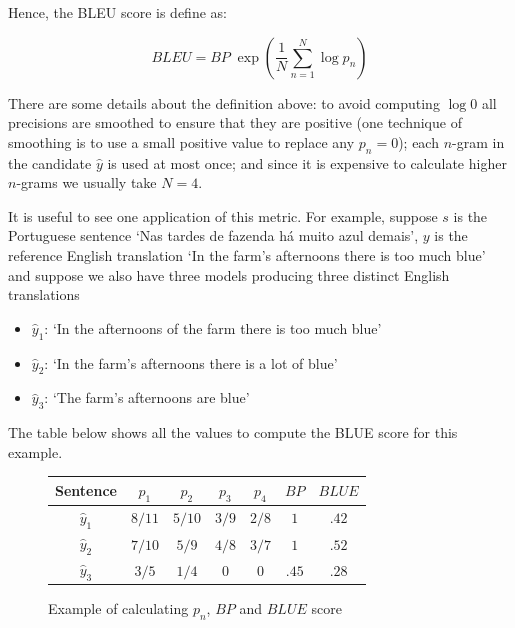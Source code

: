 Hence, the BLEU score is define as:

\begin{equation*}
BLEU = BP \; \exp \left(\frac{1}{N}  \sum_{n=1}^{N} \log p_n \right)
\end{equation*}

There are some details about the definition above: to avoid computing $\log 0$ all precisions are smoothed to ensure that they are positive (one technique of smoothing is to use a small positive value to replace any $p_n=0$); each $n$-gram in the candidate $\hat{y}$ is used at most once; and since it is expensive to calculate higher $n$-grams we usually take $N=4$.

It is useful to see one application of this metric. For example, suppose $s$ is the Portuguese sentence `Nas tardes de fazenda há muito azul demais', $y$ is the reference English translation `In the farm's afternoons there is too much blue' and suppose we also have three models producing three distinct English translations 

\begin{itemize}
\item $\hat{y}_1$: `In the afternoons of the farm there is too much blue'
\item $\hat{y}_2$: `In the farm's afternoons there is a lot of blue'
\item $\hat{y}_3$: `The farm's afternoons are blue'
\end{itemize}


The table below shows all the values to compute the BLUE score for this example.

\begin{figure}[h]
\label{bluetable}
\begin{center}
\begin{tabular}{|c|c|c|c|c|c|c|}
\hline
\cellcolor{blue!10} Sentence & \cellcolor{blue!10} $p_1$ & \cellcolor{blue!10} $p_2$ & \cellcolor{blue!10} $p_3$ & \cellcolor{blue!10} $p_4$ & \cellcolor{blue!10} $BP$ & \cellcolor{blue!10} $BLUE$ \\ \hline
\cellcolor{blue!10} $\hat{y}_1$ & $8/11$ & $5/10$ & $3/9$ & $2/8$ & $1$ & $.42$\\ \hline
\cellcolor{blue!10} $\hat{y}_2$ & $7/10$ & $5/9$ & $4/8$ & $3/7$ & $1$ & $.52$\\ \hline
\cellcolor{blue!10} $\hat{y}_3$ & $3/5$ & $1/4$ & $0$ & $0$ & $.45$ & $.28$\\ \hline
\end{tabular}
\end{center}
\caption{Example of calculating $p_n$, $BP$ and $BLUE$ score}
\end{figure}

